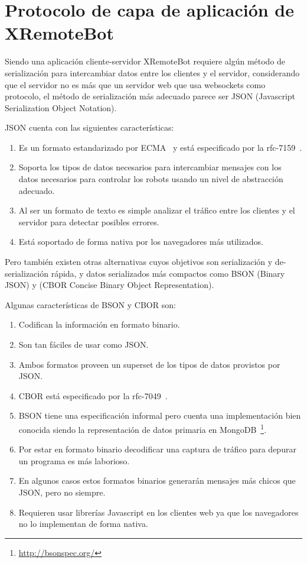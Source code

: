 \chapter{Protocolo de capa de aplicación de XRemoteBot}\label{cha:protocolo}
Siendo una aplicación cliente-servidor XRemoteBot requiere algún método de
serialización para intercambiar datos entre los clientes y el servidor,
considerando que el servidor no es más que un servidor web que usa websockets
como protocolo, el método de serialización más adecuado parece ser JSON
(Javascript Serialization Object Notation).

JSON cuenta con las siguientes características:

\begin{enumerate}
    \item Es un formato estandarizado por ECMA~\citep{ecma-404}
        y está especificado por la rfc-7159~\citep{rfc-7159}.
    \item Soporta los tipos de datos necesarios para intercambiar mensajes con
        los datos necesarios para controlar los robots usando un nivel de
        abstracción adecuado.
    \item Al ser un formato de texto es simple analizar el tráfico entre los
        clientes y el servidor para detectar posibles errores.
    \item Está soportado de forma nativa por los navegadores más
        utilizados.%
\end{enumerate}

Pero también existen otras alternativas cuyos objetivos son serialización
y de-serialización rápida, y datos serializados más compactos
como BSON (Binary JSON) y (CBOR Concise Binary Object Representation).

Algunas características de BSON y CBOR son:

\begin{enumerate}
    \item Codifican la información en formato binario.
    \item Son tan fáciles de usar como JSON.
    \item Ambos formatos proveen un superset de los tipos de datos provistos
        por JSON.
    \item CBOR está especificado por la rfc-7049~\citep{rfc-7049}.
    \item BSON tiene una especificación informal pero cuenta una
        implementación bien conocida siendo la representación de datos primaria en
        MongoDB~\footnote{\url{http://bsonspec.org/}}.
    \item Por estar en formato binario decodificar una captura de tráfico
        para depurar un programa es más laborioso.
    \item En algunos casos estos formatos binarios generarán mensajes más
        chicos que JSON, pero no siempre.
    \item Requieren usar librerías Javascript en los clientes web ya que los
        navegadores no lo implementan de forma nativa.
\end{enumerate}

